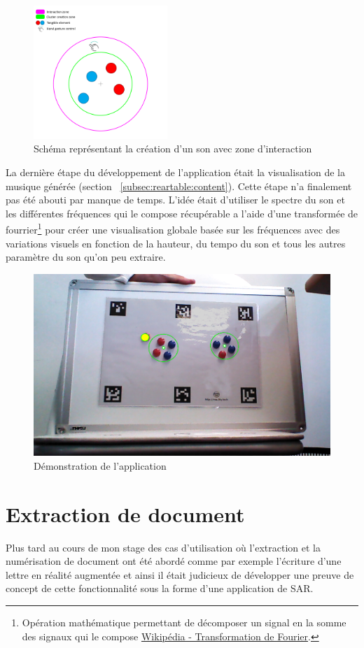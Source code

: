 \begin{figure}[H]
\centering
\includegraphics[width=0.45\textwidth]{images/reartable_cluster_interaction}
\caption{Schéma représentant la création d'un son avec zone d'interaction}
\label{fig:reartable:interactionzone}
\end{figure}

La dernière étape du développement de l'application était la visualisation de la musique générée (section ~\ref{subsec:reartable:content}). Cette étape n'a finalement pas été abouti par manque de temps. L'idée était d'utiliser le spectre du son et les différentes fréquences qui le compose récupérable a l'aide d'une transformée de fourrier\footnote{Opération mathématique permettant de décomposer un signal en la somme des signaux qui le compose \href{https://fr.wikipedia.org/wiki/Transformation_de_Fourier}{Wikipédia - Transformation de Fourier}.} pour créer une visualisation globale basée sur les fréquences avec des variations visuels en fonction de la hauteur, du tempo du son et tous les autres paramètre du son qu'on peu extraire.

\begin{figure}[H]
\centering
\includegraphics[width=0.65\linewidth]{images/reartable}
\caption{Démonstration de l'application}
\label{fig:reartable:demo}
\end{figure}

\newpage
\section{Extraction de document}
\label{sec:document}
Plus tard au cours de mon stage des cas d'utilisation où l'extraction et la numérisation de document ont été abordé comme par exemple l'écriture d'une lettre en réalité augmentée et ainsi il était judicieux de développer une preuve de concept de cette fonctionnalité sous la forme d'une application de SAR.

